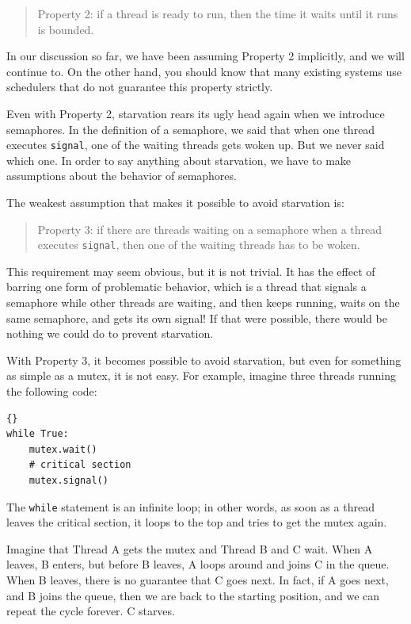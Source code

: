 \documentclass{book}
\begin{document}
\begin{quote}
Property 2: if a thread is ready to run, then the time it
waits until it runs is bounded.
\end{quote}

In our discussion so far, we have been assuming Property 2
implicitly, and we will continue to.  On the other hand,
you should know that many existing systems use schedulers
that do not guarantee this property strictly.

Even with Property 2, starvation rears its ugly head again
when we introduce semaphores.  In the definition of a semaphore,
we said that when one thread executes {\tt signal}, one of
the waiting threads gets woken up.  But we never said which one.
In order to say anything about starvation, we have to
make assumptions about the behavior of semaphores.

The weakest assumption that makes it possible to avoid
starvation is:

\begin{quote}
Property 3: if there are threads waiting on a semaphore when
a thread executes {\tt signal}, then one of the waiting threads
has to be woken.
\end{quote}

This requirement may seem obvious, but it is not trivial.  It has the
effect of barring one form of problematic behavior, which is a thread
that signals a semaphore while other threads are waiting, and then
keeps running, waits on the same semaphore, and gets its own signal!
If that were possible, there would be nothing we
could do to prevent starvation.

With Property 3, it becomes possible to avoid starvation, but
even for something as simple as a mutex, it is not easy.
For example, imagine three threads
running the following code:

\begin{lstlisting}[caption={Mutex loop}]{}
while True:
    mutex.wait()
    # critical section 
    mutex.signal()
\end{lstlisting}

The {\tt while} statement is an infinite loop; in other words,
as soon as a thread leaves the critical section, it loops to the
top and tries to get the mutex again.

Imagine that Thread A gets the mutex and Thread B and C wait.
When A leaves, B enters, but before B leaves, A loops around
and joins C in the queue.  When B leaves, there is no guarantee
that C goes next.  In fact, if A goes next, and B joins the
queue, then we are back to the starting position, and we can
repeat the cycle forever.  C starves.
\end{document}
